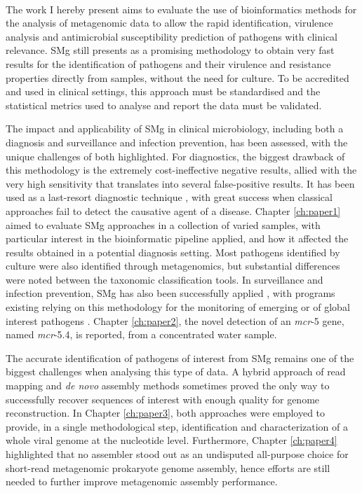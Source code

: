 \mbox{}\\
\vspace{8cm}

The work I hereby present aims to evaluate the use of bioinformatics methods for the analysis of metagenomic data to allow the rapid identification, virulence analysis and antimicrobial susceptibility prediction of pathogens with clinical relevance. \ac{SMg} still presents as a promising methodology to obtain very fast results for the identification of pathogens and their virulence and resistance properties directly from samples, without the need for culture. 
To be accredited and used in clinical settings, this approach must be standardised and the statistical metrics used to analyse and report the data must be validated.

The impact and applicability of \ac{SMg} in clinical microbiology, including both a diagnosis and surveillance and infection prevention, has been assessed, with the unique challenges of both highlighted. For diagnostics, the biggest drawback of this methodology is the extremely cost-ineffective negative results, allied with the very high sensitivity that translates into several false-positive results. It has been used as a last-resort diagnostic technique \citep{he_case_2022, vijayvargiya_application_2019, sanabria_shotgun-metagenomics_2020, hirakata_application_2021}, with great success when classical approaches fail to detect the causative agent of a disease. Chapter \ref{ch:paper1} aimed to evaluate \ac{SMg} approaches in a collection of varied samples, with particular interest in the bioinformatic pipeline applied, and how it affected the results obtained in a potential diagnosis setting. Most pathogens identified by culture were also identified through metagenomics, but substantial differences were noted between the taxonomic classification tools. In surveillance and infection prevention, \ac{SMg} has also been successfully applied \citep{loman_culture-independent_2013, huang_metagenomics_2017, li_microbiome_2021}, with programs existing relying on this methodology for the monitoring of emerging or of global interest pathogens \citep{ko_metagenomics-enabled_2022}. Chapter \ref{ch:paper2}, the novel detection of an \textit{mcr}-5 gene, named \textit{mcr}-5.4, is reported, from a concentrated water sample. 

The accurate identification of pathogens of interest from \ac{SMg} remains one of the biggest challenges when analysing this type of data. A hybrid approach of read mapping and \textit{de novo} assembly methods sometimes proved the only way to successfully recover sequences of interest with enough quality for genome reconstruction. In Chapter \ref{ch:paper3}, both approaches were employed to provide, in a single methodological step, identification and characterization of a whole viral genome at the nucleotide level. Furthermore, Chapter \ref{ch:paper4} highlighted that no assembler stood out as an undisputed all-purpose choice for short-read metagenomic prokaryote genome assembly, hence efforts are still needed to further improve metagenomic assembly performance. 

